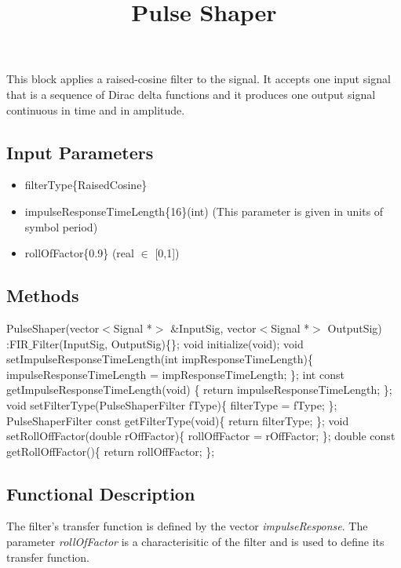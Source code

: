 \documentclass[a4paper]{article}
\title{Pulse Shaper}
\begin{document}
\maketitle

This block applies a raised-cosine filter to the signal. It accepts one input signal that is a sequence of Dirac delta functions and it produces one output signal continuous in time and in amplitude.

\subsection*{Input Parameters}

\begin{itemize}
	\item filterType\{RaisedCosine\} \linebreak
	\item impulseResponseTimeLength\{16\}\linebreak (int) 
	\linebreak (This parameter is given in units of symbol period)
	\item rollOfFactor\{0.9\} \linebreak
	(real $\in$ [0,1])
\end{itemize}

\subsection*{Methods}

PulseShaper(vector$<$Signal *$>$ \&InputSig, vector$<$Signal *$>$ OutputSig) :FIR$\_$Filter(InputSig, OutputSig)\{\};
\bigbreak	
void initialize(void);
\bigbreak	
void setImpulseResponseTimeLength(int impResponseTimeLength)\{ impulseResponseTimeLength = impResponseTimeLength; \};
\bigbreak
int const getImpulseResponseTimeLength(void) \{ return impulseResponseTimeLength; \};
\bigbreak	
void setFilterType(PulseShaperFilter fType)\{ filterType = fType; \};
\bigbreak
PulseShaperFilter const getFilterType(void)\{ return filterType; \};
\bigbreak	
void setRollOffFactor(double rOffFactor)\{ rollOffFactor = rOffFactor; \};
\bigbreak
double const getRollOffFactor()\{ return rollOffFactor; \};

\subsection*{Functional Description}

The filter's transfer function is defined by the vector \textit{impulseResponse}. The parameter \textit{rollOfFactor} is a characterisitic of the filter and is used to define its transfer function.
\end{document}
